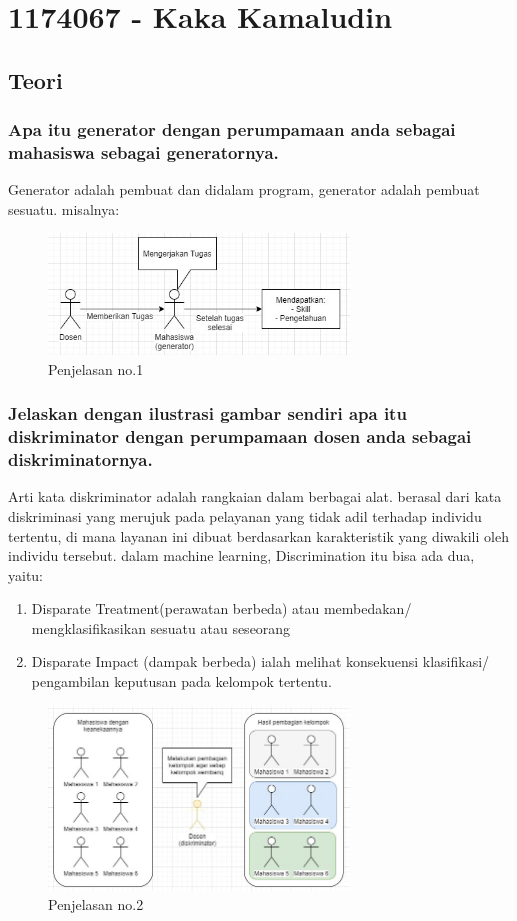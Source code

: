 \section{1174067 - Kaka Kamaludin}
\subsection{Teori}
\subsubsection{Apa itu generator dengan perumpamaan anda sebagai mahasiswa sebagai generatornya.}
\hfill\break
Generator adalah pembuat dan didalam program, generator adalah pembuat sesuatu. misalnya: 
\begin{figure}[H]
	\centering
	\includegraphics[width=8cm]{figures/1174067/8/1.jpg}
	\caption{Penjelasan no.1}
\end{figure}

\subsubsection{Jelaskan dengan ilustrasi gambar sendiri apa itu diskriminator dengan perumpamaan dosen anda sebagai diskriminatornya.}
\hfill\break
Arti kata diskriminator adalah rangkaian dalam berbagai alat. berasal dari kata diskriminasi yang merujuk pada pelayanan yang tidak adil terhadap individu tertentu, di mana layanan ini dibuat berdasarkan karakteristik yang diwakili oleh individu tersebut. dalam machine learning, Discrimination itu bisa ada dua, yaitu:
\begin{enumerate}
\item Disparate Treatment(perawatan berbeda) atau membedakan/ mengklasifikasikan sesuatu atau seseorang
\item Disparate Impact (dampak berbeda) ialah melihat konsekuensi klasifikasi/ pengambilan keputusan pada kelompok tertentu.
\end{enumerate}
\begin{figure}[H]
	\centering
	\includegraphics[width=8cm]{figures/1174067/8/2.jpg}
	\caption{Penjelasan no.2}
\end{figure}

